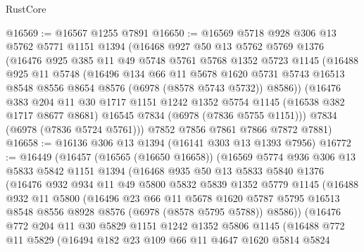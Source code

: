 \begin{lexlean}{RustCore}
\begin{coremodule}
@16569 := @16567 @1255 @7891
@16650 := @16569
    @5718
    @928
    @306
    @13
    @5762
    @5771
    @1151
    @1394
    (@16468
      @927
      @50
      @13
      @5762
      @5769
      @1376
      (@16476
        @925
        @385
        @11
        @49
        @5748
        @5761
        @5768
        @1352
        @5723
        @1145
        (@16488
          @925
          @11
          @5748
          (@16496
            @134
            @66
            @11
            @5678
            @1620
            @5731
            @5743
            @16513
            @8548
            @8556
            @8654
            @8576
            (@6978 (@8578 @5743 @5732))
            @8586))
        (@16476
          @383
          @204
          @11
          @30
          @1717
          @1151
          @1242
          @1352
          @5754
          @1145
          (@16538 @382 @1717 @8677 @8681)
          @16545
          @7834
          (@6978 (@7836 @5755 @1151)))
        @7834
        (@6978 (@7836 @5724 @5761)))
      @7852
      @7856
      @7861
      @7866
      @7872
      @7881)
@16658 := @16136 @306 @13 @1394 (@16141 @303 @13 @1393 @7956)
@16772 := @16449
    (@16457
      (@16565 (@16650 @16658))
      (@16569
        @5774
        @936
        @306
        @13
        @5833
        @5842
        @1151
        @1394
        (@16468
          @935
          @50
          @13
          @5833
          @5840
          @1376
          (@16476
            @932
            @934
            @11
            @49
            @5800
            @5832
            @5839
            @1352
            @5779
            @1145
            (@16488
              @932
              @11
              @5800
              (@16496
                @23
                @66
                @11
                @5678
                @1620
                @5787
                @5795
                @16513
                @8548
                @8556
                @8928
                @8576
                (@6978 (@8578 @5795 @5788))
                @8586))
            (@16476
              @772
              @204
              @11
              @30
              @5829
              @1151
              @1242
              @1352
              @5806
              @1145
              (@16488
                @772
                @11
                @5829
                (@16494
                  @182
                  @23
                  @109
                  @66
                  @11
                  @4647
                  @1620
                  @5814
                  @5824

\end{coremodule}
\end{lexlean}
